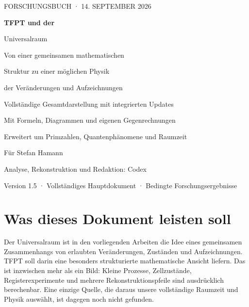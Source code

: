 \documentclass[11pt,a4paper,oneside,parskip=half,headings=normal]{scrreprt}
\begin{document}
\hypersetup{pageanchor=false}
\begin{titlepage}
\pagecolor{navy}\color{white}
\vspace*{5mm}
{\sffamily\large FORSCHUNGSBUCH · 14. SEPTEMBER 2026\par}
\vspace{22mm}
{\sffamily\bfseries\fontsize{36}{42}\selectfont TFPT und der\par Universalraum\par}
\vspace{12mm}
{\sffamily\fontsize{17}{23}\selectfont Von einer gemeinsamen mathematischen\par Struktur zu einer möglichen Physik\par der Veränderungen und Aufzeichnungen\par}
\vspace{15mm}
\vfill
{\sffamily\large Vollständige Gesamtdarstellung mit integrierten Updates\par}
\vspace{4mm}
{\sffamily\normalsize Mit Formeln, Diagrammen und eigenen Gegenrechnungen\par Erweitert um Primzahlen, Quantenphänomene und Raumzeit\par}
\vspace{12mm}
{\sffamily\small Für Stefan Hamann\par Analyse, Rekonstruktion und Redaktion: Codex\par}
\vspace{6mm}
{\sffamily\small\color{white!75}Version 1.5 · Vollständiges Hauptdokument · Bedingte Forschungsergebnisse\par}
\end{titlepage}
\nopagecolor\color{black}
\hypersetup{pageanchor=true}
\chapter*{Was dieses Dokument leisten soll}
Der Universalraum ist in den vorliegenden Arbeiten die Idee eines gemeinsamen Zusammenhangs von erlaubten Veränderungen, Zuständen und Aufzeichnungen. TFPT soll darin eine besonders strukturierte mathematische Ansicht liefern. Das ist inzwischen mehr als ein Bild: Kleine Prozesse, Zellzustände, Registerexperimente und mehrere Rekonstruktionspfeile sind ausdrücklich berechenbar. Eine einzige Quelle, die daraus unsere vollständige Raumzeit und Physik auswählt, ist dagegen noch nicht gefunden.
\end{document}

